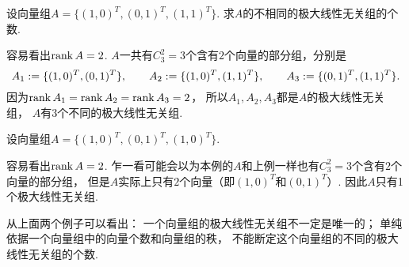 \begingroup
\begin{example}
设向量组\(A = \{(1,0)^T,(0,1)^T,(1,1)^T\}\).
求\(A\)的不相同的极大线性无关组的个数.
\begin{solution}
容易看出\(\rank A = 2\).
\(A\)一共有\(C_3^2 = 3\)个含有\(2\)个向量的部分组，分别是\begin{equation*}
	A_1 := \{(1,0)^T,(0,1)^T\},
	\qquad
	A_2 := \{(1,0)^T,(1,1)^T\},
	\qquad
	A_3 := \{(0,1)^T,(1,1)^T\}.
\end{equation*}
因为\(
	\rank A_1
	= \rank A_2
	= \rank A_3
	= 2
\)，
所以\(A_1,A_2,A_3\)都是\(A\)的极大线性无关组，
\(A\)有3个不同的极大线性无关组.
\end{solution}
\end{example}
\begin{example}
设向量组\(A = \{(1,0)^T,(0,1)^T,(1,0)^T\}\).
\begin{solution}
容易看出\(\rank A = 2\).
乍一看可能会以为本例的\(A\)和上例一样也有\(C_3^2 = 3\)个含有\(2\)个向量的部分组，
但是\(A\)实际上只有\(2\)个向量（即\((1,0)^T\)和\((0,1)^T\)）.
因此\(A\)只有1个极大线性无关组.
\end{solution}
\end{example}
\begin{remark}
从上面两个例子可以看出：
一个向量组的极大线性无关组不一定是唯一的；
单纯依据一个向量组中的向量个数和向量组的秩，
不能断定这个向量组的不同的极大线性无关组的个数.
\end{remark}
\endgroup
